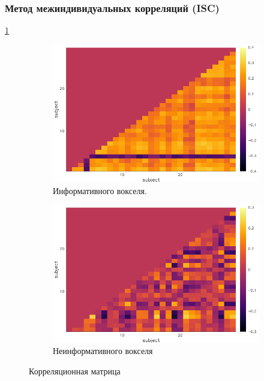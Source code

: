 \subsubsection*{Метод межиндивидуальных корреляций (ISC)}


\ref{pic:cormat}


\begin{figure}
	\begin{subfigure}[b]{0.4\textwidth}
		\includegraphics[width=\textwidth]{img/corisc.png}
		\caption{Информативного вокселя.}		
	\end{subfigure}
	\hfill
	\begin{subfigure}[b]{0.4\textwidth}
		\includegraphics[width=\textwidth]{img/incisc.png}
		\caption{Неинформативного вокселя}
	\end{subfigure}
	\caption{Корреляционная матрица}
	\label{pic:cormat}
\end{figure}



